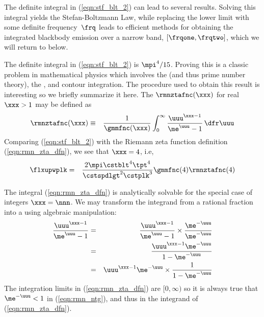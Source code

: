 \documentclass[12pt]{article}
\begin{document}
The definite integral in (\ref{eqn:stf_blt_2}) can lead to several
results.
Solving this integral yields the Stefan-Boltzmann Law, while replacing
the lower limit with some definite frequency~$\frq$ leads to efficient
methods for obtaining the integrated blackbody emission over a narrow
band, $[\frqone,\frqtwo]$, which we will return to below.

The definite integral in (\ref{eqn:stf_blt_2}) is $\mpi^{4}/15$. 
Proving this is a classic problem in mathematical physics which
involves the  (and thus prime number
theory), the , and contour integration.
The procedure used to obtain this result is interesting so we briefly
summarize it here.
The  $\rmnztafnc(\xxx)$ for real $\xxx > 1$
may be defined as
\begin{eqnarray}
\rmnztafnc(\xxx) & \equiv & \frac{1}{\gmmfnc(\xxx)}
\int_{0}^{\infty} \frac{\uuu^{\xxx-1}}{\me^{\uuu}-1} \,\dfr\uuu
\label{eqn:rmn_zta_dfn}
\end{eqnarray}
Comparing (\ref{eqn:stf_blt_2}) with the Riemann zeta function
definition (\ref{eqn:rmn_zta_dfn}), we see that $\xxx=4$, i.e, 
\begin{eqnarray}
\flxupwplk 
& = & \frac{2 \mpi \cstblt^{4} \tpt^{4} }{\cstspdlgt^{2} \cstplk^{3}} 
\gmmfnc(4)\rmnztafnc(4)
\label{eqn:stf_blt_rmn}
\end{eqnarray}

The integral (\ref{eqn:rmn_zta_dfn}) is analytically solvable for 
the special case of integers $\xxx = \nnn$.
We may transform the integrand from a rational fraction into a
 using algebraic manipulation:
\begin{eqnarray}
\frac{\uuu^{\xxx-1}}{\me^{\uuu}-1} 
& = & \frac{\uuu^{\xxx-1}}{\me^{\uuu}-1} \times \frac{\me^{-\uuu}}{\me^{-\uuu}} \nonumber \\
& = & \frac{\uuu^{\xxx-1}\me^{-\uuu}}{1-\me^{-\uuu}} \nonumber \\
& = & \uuu^{\xxx-1}\me^{-\uuu} \times \frac{1}{1-\me^{-\uuu}}
\label{eqn:rmn_ntg}
\end{eqnarray}
The integration limits in (\ref{eqn:rmn_zta_dfn}) are $[0,\infty)$
so it is always true that $\me^{-\uuu} < 1$ in (\ref{eqn:rmn_ntg}),
and thus in the integrand of (\ref{eqn:rmn_zta_dfn}).
\end{document}
